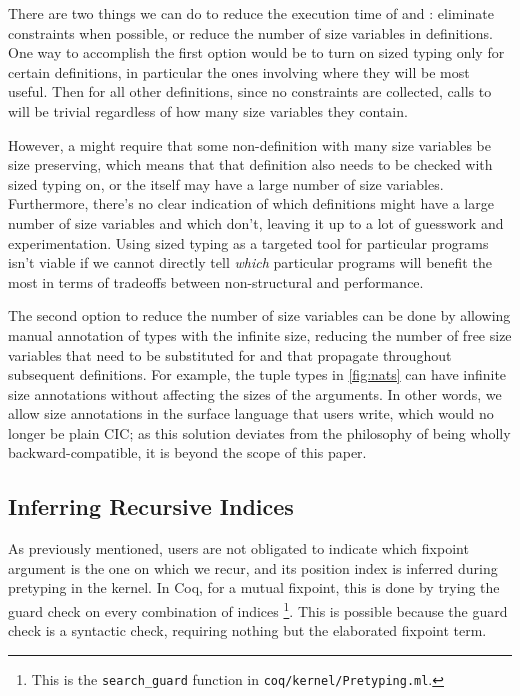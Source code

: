 There are two things we can do to reduce the execution time of \solve and \RecCheck:
eliminate constraints when possible, or reduce the number of size variables in definitions.
One way to accomplish the first option would be to turn on sized typing only for certain definitions,
in particular the ones involving \cofixpoints where they will be most useful.
Then for all other definitions, since no constraints are collected,
calls to \solve will be trivial regardless of how many size variables they contain.

However, a \cofixpoint might require that some non-\corecursive definition with many size variables be size preserving,
which means that that definition also needs to be checked with sized typing on,
or the \cofixpoint itself may have a large number of size variables.
Furthermore, there's no clear indication of which definitions might have a large number of size variables and which don't,
leaving it up to a lot of guesswork and experimentation.
Using sized typing as a targeted tool for particular programs isn't viable
if we cannot directly tell \emph{which} particular programs will benefit the most
in terms of tradeoffs between non-structural \corecursion and performance.

The second option to reduce the number of size variables can be done by allowing manual annotation of \coinductive types with the infinite size,
reducing the number of free size variables that need to be substituted for
and that propagate throughout subsequent definitions.
For example, the tuple types in \autoref{fig:nats} can have infinite size annotations
without affecting the sizes of the  arguments.
In other words, we allow size annotations in the surface language that users write,
which would no longer be plain CIC;
as this solution deviates from the philosophy of being wholly backward-compatible,
it is beyond the scope of this paper.

\subsection{Inferring Recursive Indices}\label{sec:impl:recind}

As previously mentioned, users are not obligated to indicate which fixpoint argument is the one on which we recur,
and its position index is inferred during pretyping in the kernel.
In Coq, for a mutual fixpoint, this is done by trying the guard check on every combination of indices%
\footnote{This is the \texttt{search\_guard} function in \texttt{coq/kernel/Pretyping.ml}.}.
This is possible because the guard check is a syntactic check, requiring nothing but the elaborated fixpoint term.

